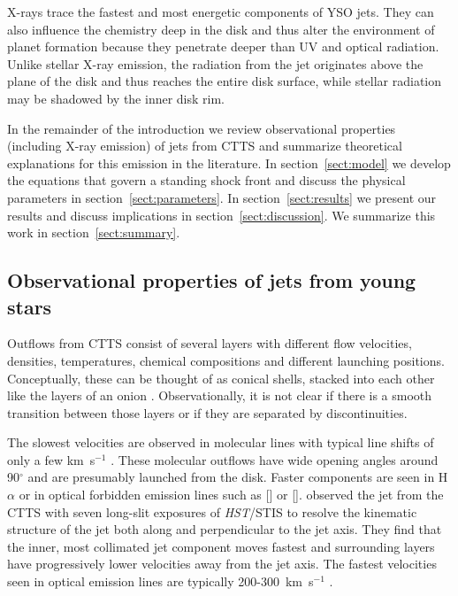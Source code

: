 \documentclass{emulateapj}
\begin{document}
X-rays trace the fastest and most energetic components of YSO jets. They can also influence the chemistry deep in the disk \citep[e.g.][]{2010ApJ...714.1511H,2012ApJ...756..157G} and thus alter the environment of planet formation because they penetrate deeper than UV and optical radiation. Unlike stellar X-ray emission, the radiation from the jet originates above the plane of the disk and thus reaches the entire disk surface, while stellar radiation may be shadowed by the inner disk rim.

In the remainder of the introduction we review observational properties (including X-ray emission) of jets from CTTS and summarize theoretical explanations for this emission in the literature. In section~\ref{sect:model} we develop the equations that govern a standing shock front and discuss the physical parameters in section~\ref{sect:parameters}. In section~\ref{sect:results} we present our results and discuss implications in section~\ref{sect:discussion}. We summarize this work in section~\ref{sect:summary}.

\subsection{Observational properties of jets from young stars}

Outflows from CTTS consist of several layers with different flow velocities, densities, temperatures, chemical compositions and different launching positions. Conceptually, these can be thought of as conical shells, stacked into each other like the layers of an onion \citep{2000ApJ...537L..49B}. Observationally, it is not clear if there is a smooth transition between those layers or if they are separated by discontinuities. 

The slowest velocities are observed in molecular lines with typical line shifts of only a few km~s$^{-1}$ \citep{2008ApJ...676..472B}. These molecular outflows have wide opening angles around 90$^{\circ}$ \citep[e.g.][]{2013A&A...557A.110S,2014A&A...564A..11A} and are presumably launched from the disk. Faster components are seen in H$\alpha$ or in optical forbidden emission lines such as [] or []. \citet{2000ApJ...537L..49B} observed the jet from the CTTS  with seven long-slit exposures of \emph{HST}/STIS to resolve the kinematic structure of the jet both along and perpendicular to the jet axis. They find that the inner, most collimated jet component moves fastest and surrounding layers have progressively lower velocities away from the jet axis. The fastest velocities seen in optical emission lines are typically 200-300~km~s$^{-1}$ \citep{2004Ap&SS.292..651B,2008ApJ...689.1112C,2013A&A...550L...1S}.
\end{document}
